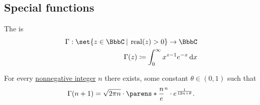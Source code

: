 \subsection{Special functions}\label{subsec:special_functions}

\begin{definition}\label{def:gamma_function}
  The  is
  \begin{equation*}
    \begin{aligned}
      \Gamma: \set{ z \in \BbbC \given \real(z) > 0 } \to \BbbC \\
      \Gamma(z) \coloneqq \int_0^\infty x^{z-1} e^{-x} \dl x
    \end{aligned}
  \end{equation*}
\end{definition}

\begin{theorem}\label{thm:stirlings_gamma_approximation}
  For every \hyperref[rem:peano_arithmetic_zero/nonnegative]{nonnegative integer} \( n \) there exists, some constant \( \theta \in (0, 1) \) such that
  \begin{equation*}
    \Gamma(n + 1) = \sqrt{2 \pi n} \cdot \parens*{ \frac n e }^n \cdot e^{\frac 1 {12n + \theta}}.
  \end{equation*}
\end{theorem}
